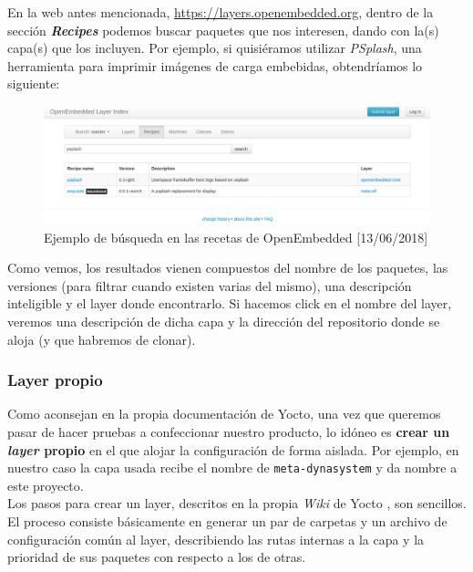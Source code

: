 En la web antes mencionada, \url{https://layers.openembedded.org}, dentro de la sección \textbf{\textit{Recipes}} podemos buscar paquetes que nos interesen, dando con la(s) capa(s) que los incluyen. Por ejemplo, si quisiéramos utilizar \textit{PSplash}, una herramienta para imprimir imágenes de carga embebidas, obtendríamos lo siguiente:

\begin{figure}[H]
	\centering
	\includegraphics[width=\linewidth]{imagenes/yocto-recipe-search-example.png}
	\caption{Ejemplo de búsqueda en las recetas de OpenEmbedded [13/06/2018]}
	\label{yocto-recipe-search-example}
\end{figure}

Como vemos, los resultados vienen compuestos del nombre de los paquetes, las versiones (para filtrar cuando existen varias del mismo), una descripción inteligible y el layer donde encontrarlo. Si hacemos click en el nombre del layer, veremos una descripción de dicha capa y la dirección del repositorio donde se aloja (y que habremos de clonar).\\

\subsubsection{Layer propio}

Como aconsejan en la propia documentación de Yocto, una vez que queremos pasar de hacer pruebas a confeccionar nuestro producto, lo idóneo es \textbf{crear un \textit{layer} propio} en el que alojar la configuración de forma aislada. Por ejemplo, en nuestro caso la capa usada recibe el nombre de \texttt{meta-dynasystem} y da nombre a este proyecto.\\

Los pasos para crear un layer, descritos en la propia \textit{Wiki} de Yocto \cite{wiki-yocto-own-layer}, son sencillos. El proceso consiste básicamente en generar un par de carpetas y un archivo de configuración común al layer, describiendo las rutas internas a la capa y la prioridad de sus paquetes con respecto a los de otras.\\

